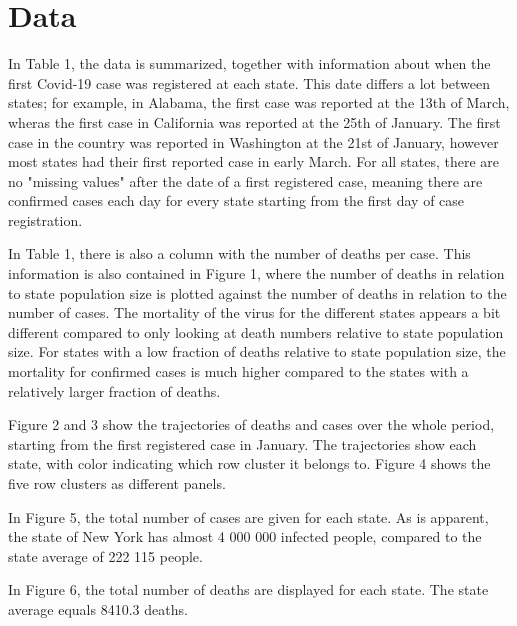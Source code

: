 \documentclass[12pt,a4paper]{article}
\begin{document}
\section{Data}
In Table 1, the data is summarized, together with information about when the first Covid-19 case was registered at each state. This date differs a lot between states; for example, in Alabama, the first case was reported at the 13th of March, wheras the first case in California was reported at the 25th of January. The first case in the country was reported in Washington at the 21st of January, however most states had their first reported case in early March. For all states, there are no "missing values" after the date of a first registered case, meaning there are confirmed cases each day for every state starting from the first day of case registration. 

In Table 1, there is also a column with the number of deaths per case. This information is also contained in Figure 1, where the number of deaths in relation to state population size is plotted against the number of deaths in relation to the number of cases. The mortality of the virus for the different states appears a bit different compared to only looking at death numbers relative to state population size. For states with a low fraction of deaths relative to state population size, the mortality for confirmed cases is much higher compared to the states with a relatively larger fraction of deaths.

Figure 2 and 3 show the trajectories of deaths and cases over the whole period, starting from the first registered case in January. The trajectories show each state, with color indicating which row cluster it belongs to. Figure 4 shows the five row clusters as different panels. 

In Figure 5, the total number of cases are given for each state. As is apparent, the state of New York has almost 4 000 000 infected people, compared to the state average of 222 115 people. 

In Figure 6, the total number of deaths are displayed for each state. The state average equals 8410.3 deaths. 
\end{document}
